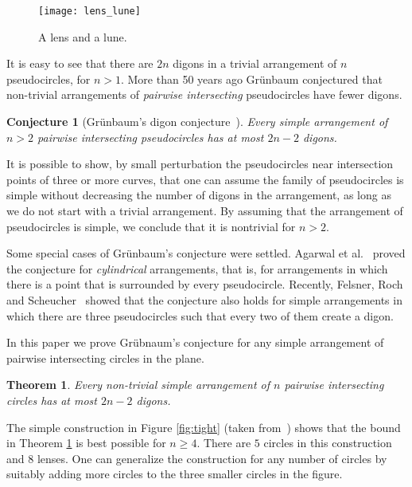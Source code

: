 \documentclass[11pt,a4paper]{article}
\renewcommand{\geq}{\geqslant}
\newtheorem{theorem}{Theorem}
\newtheorem{conjecture}{Conjecture}
\begin{document}
\begin{figure}[ht]
	\centering
	\texttt{[image: lens\_lune]}
	\caption{A lens and a lune.}
	\label{fig:lens_lune}
\end{figure}

It is easy to see that there are $2n$ digons in a trivial arrangement of $n$ pseudocircles, for $n>1$.
More than 50 years ago Gr\"unbaum conjectured that non-trivial arrangements of \emph{pairwise intersecting} pseudocircles have fewer digons.

\begin{conjecture}[Gr\"unbaum’s digon conjecture~{\cite[Conjecture 3.6]{GRUNB72}}]\label{conj:grunb}
	Every simple arrangement of $n > 2$ pairwise intersecting pseudocircles has at most $2n-2$ digons.
\end{conjecture}


It is possible to show, by small perturbation the pseudocircles near intersection points of three or more curves, that one can assume the family of pseudocircles is simple without decreasing the number of digons in the arrangement, as long as we do not start with a trivial arrangement.
By assuming that the arrangement of pseudocircles is 
simple, we conclude that it is nontrivial for $n>2$.

Some special cases of Gr\"unbaum's conjecture were settled.
Agarwal et al.~\cite{ANPPSS04} proved the conjecture for \emph{cylindrical} arrangements, that is, for arrangements in which there is a point that is surrounded by every pseudocircle.
Recently, Felsner, Roch and Scheucher~\cite{FELSNER23} showed that the conjecture also holds for simple arrangements in which there are three pseudocircles such that every two of them create a digon.

In this paper we prove Gr\"ubnaum's conjecture for any simple arrangement of pairwise intersecting circles in the plane.

\begin{theorem}\label{theorem:main}
	Every non-trivial simple arrangement of $n$ pairwise intersecting circles has at most $2n-2$ digons.
\end{theorem}



The simple construction in Figure \ref{fig:tight} (taken from~\cite{GRUNB72}) shows 
that the bound in Theorem \ref{theorem:main} is best possible for $n \geq 4$. There are $5$ circles in this construction and $8$ lenses. 
One can generalize the construction for any number of circles by suitably adding more circles to the three smaller circles
in the figure.
\end{document}
